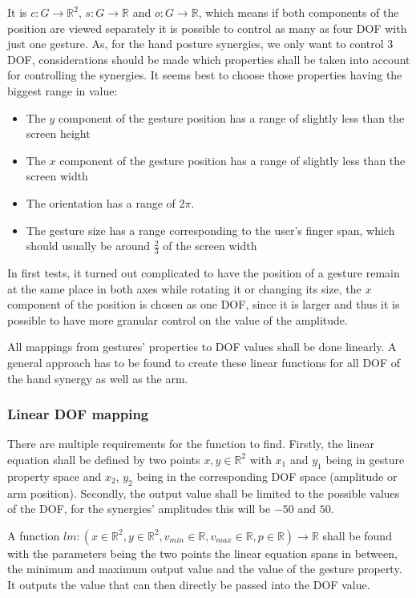 It is $c:G\rightarrow\mathbb{R}^2$, $s:G\rightarrow\mathbb{R}$ and $o:G\rightarrow\mathbb{R}$, which means if both components of the position are viewed separately it is possible to control as many as four DOF with just one gesture. As, for the hand posture synergies, we only want to control 3 DOF, considerations should be made which properties shall be taken into account for controlling the synergies. It seems best to choose those properties having the biggest range in value:
\begin{itemize}
	\item The $y$ component of the gesture position has a range of slightly less than the screen height
	\item The $x$ component of the gesture position has a range of slightly less than the screen width
	\item The orientation has a range of $2\pi$.
	\item The gesture size has a range corresponding to the user's finger span, which should usually be around $\frac{2}{3}$ of the screen width
\end{itemize}

In first tests, it turned out complicated to have the position of a gesture remain at the same place in both axes while rotating it or changing its size, the $x$ component of the position is chosen as one DOF, since it is larger and thus it is possible to have more granular control on the value of the amplitude.

All mappings from gestures' properties to DOF values shall be done linearly. A general approach has to be found to create these linear functions for all DOF of the hand synergy as well as the arm.

\subsubsection{Linear DOF mapping}

There are multiple requirements for the function to find. Firstly, the linear equation shall be defined by two points $x, y \in \mathbb{R}^2$ with $x_1$ and $y_1$ being in gesture property space and $x_2$, $y_2$ being in the corresponding DOF space (amplitude or arm position). Secondly, the output value shall be limited to the possible values of the DOF, for the synergies' amplitudes this will be $-50$ and $50$.

A function $lm:(x \in \mathbb{R}^2, y \in \mathbb{R}^2, v_{min} \in \mathbb{R}, v_{max} \in \mathbb{R}, p \in \mathbb{R}) \rightarrow \mathbb{R}$ shall be found with the parameters being the two points the linear equation spans in between, the minimum and maximum output value and the value of the gesture property. It outputs the value that can then directly be passed into the DOF value.

